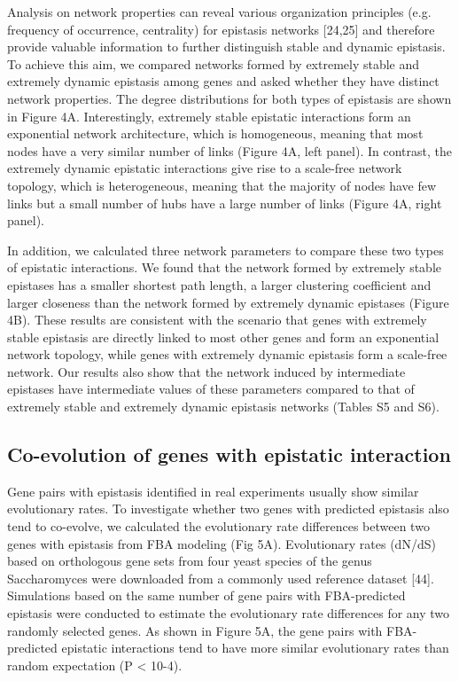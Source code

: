 Analysis on network properties can reveal various organization
principles (e.g. frequency of occurrence, centrality) for epistasis
networks [24,25] and therefore provide valuable information to further
distinguish stable and dynamic epistasis. To achieve this aim, we
compared networks formed by extremely stable and extremely dynamic
epistasis among genes and asked whether they have distinct network
properties. The degree distributions for both types of epistasis are
shown in Figure 4A. Interestingly, extremely stable epistatic
interactions form an exponential network architecture, which is
homogeneous, meaning that most nodes have a very similar number of
links (Figure 4A, left panel). In contrast, the extremely dynamic
epistatic interactions give rise to a scale-free network topology,
which is heterogeneous, meaning that the majority of nodes have few
links but a small number of hubs have a large number of links (Figure
4A, right panel).

In addition, we calculated three network parameters to compare these
two types of epistatic interactions. We found that the network formed
by extremely stable epistases has a smaller shortest path length, a
larger clustering coefficient and larger closeness than the network
formed by extremely dynamic epistases (Figure 4B). These results are
consistent with the scenario that genes with extremely stable
epistasis are directly linked to most other genes and form an
exponential network topology, while genes with extremely dynamic
epistasis form a scale-free network. Our results also show that the
network induced by intermediate epistases have intermediate values of
these parameters compared to that of extremely stable and extremely
dynamic epistasis networks (Tables S5 and S6).

\subsection{Co-evolution of genes with epistatic interaction}

Gene pairs with epistasis identified in real experiments usually show
similar evolutionary rates. To investigate whether two genes with
predicted epistasis also tend to co-evolve, we calculated the
evolutionary rate differences between two genes with epistasis from
FBA modeling (Fig 5A). Evolutionary rates (dN/dS) based on orthologous
gene sets from four yeast species of the genus Saccharomyces were
downloaded from a commonly used reference dataset [44]. Simulations
based on the same number of gene pairs with FBA-predicted epistasis
were conducted to estimate the evolutionary rate differences for any
two randomly selected genes. As shown in Figure 5A, the gene pairs
with FBA-predicted epistatic interactions tend to have more similar
evolutionary rates than random expectation (P < 10-4).


